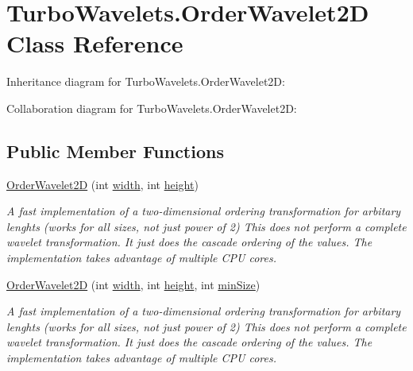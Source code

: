 \hypertarget{class_turbo_wavelets_1_1_order_wavelet2_d}{\section{Turbo\+Wavelets.\+Order\+Wavelet2\+D Class Reference}
\label{class_turbo_wavelets_1_1_order_wavelet2_d}
}


Inheritance diagram for Turbo\+Wavelets.\+Order\+Wavelet2\+D\+:


Collaboration diagram for Turbo\+Wavelets.\+Order\+Wavelet2\+D\+:
\subsection*{Public Member Functions}
\begin{DoxyCompactItemize}
\item 
\hyperlink{class_turbo_wavelets_1_1_order_wavelet2_d_aed357d3d66affbf094ee6e104ac75f1f}{Order\+Wavelet2\+D} (int \hyperlink{class_turbo_wavelets_1_1_wavelet2_d_aaa4b3711957fe1798980e6891331a08d}{width}, int \hyperlink{class_turbo_wavelets_1_1_wavelet2_d_afb2aa87b89b82f329357cbdc0cde18a8}{height})
\begin{DoxyCompactList}\small\item\em A fast implementation of a two-\/dimensional ordering transformation for arbitary lenghts (works for all sizes, not just power of 2) This does not perform a complete wavelet transformation. It just does the cascade ordering of the values. The implementation takes advantage of multiple C\+P\+U cores. \end{DoxyCompactList}\item 
\hyperlink{class_turbo_wavelets_1_1_order_wavelet2_d_a22aec9d1c8fd7f56ac480a305ce4e9cd}{Order\+Wavelet2\+D} (int \hyperlink{class_turbo_wavelets_1_1_wavelet2_d_aaa4b3711957fe1798980e6891331a08d}{width}, int \hyperlink{class_turbo_wavelets_1_1_wavelet2_d_afb2aa87b89b82f329357cbdc0cde18a8}{height}, int \hyperlink{class_turbo_wavelets_1_1_wavelet2_d_af5148ef1a46dd5694ccea13aa8f1b9e2}{min\+Size})
\begin{DoxyCompactList}\small\item\em A fast implementation of a two-\/dimensional ordering transformation for arbitary lenghts (works for all sizes, not just power of 2) This does not perform a complete wavelet transformation. It just does the cascade ordering of the values. The implementation takes advantage of multiple C\+P\+U cores. \end{DoxyCompactList}\end{DoxyCompactItemize}

